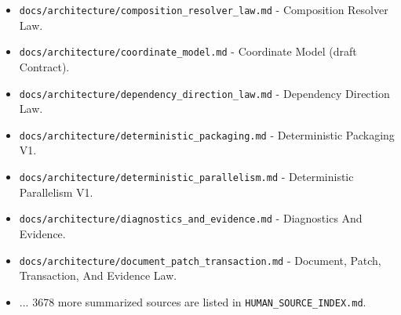 \documentclass[9pt,a4paper,openany]{book}
\begin{document}
\begin{itemize}
\item \texttt{docs/\allowbreak{}architecture/\allowbreak{}composition\_\allowbreak{}resolver\_\allowbreak{}law.\allowbreak{}md} -\allowbreak{} Composition Resolver Law.\allowbreak{}
\end{itemize}

\begin{itemize}
\item \texttt{docs/\allowbreak{}architecture/\allowbreak{}coordinate\_\allowbreak{}model.\allowbreak{}md} -\allowbreak{} Coordinate Model (draft Contract).\allowbreak{}
\end{itemize}

\begin{itemize}
\item \texttt{docs/\allowbreak{}architecture/\allowbreak{}dependency\_\allowbreak{}direction\_\allowbreak{}law.\allowbreak{}md} -\allowbreak{} Dependency Direction Law.\allowbreak{}
\end{itemize}

\begin{itemize}
\item \texttt{docs/\allowbreak{}architecture/\allowbreak{}deterministic\_\allowbreak{}packaging.\allowbreak{}md} -\allowbreak{} Deterministic Packaging V1.\allowbreak{}
\end{itemize}

\begin{itemize}
\item \texttt{docs/\allowbreak{}architecture/\allowbreak{}deterministic\_\allowbreak{}parallelism.\allowbreak{}md} -\allowbreak{} Deterministic Parallelism V1.\allowbreak{}
\end{itemize}

\begin{itemize}
\item \texttt{docs/\allowbreak{}architecture/\allowbreak{}diagnostics\_\allowbreak{}and\_\allowbreak{}evidence.\allowbreak{}md} -\allowbreak{} Diagnostics And Evidence.\allowbreak{}
\end{itemize}

\begin{itemize}
\item \texttt{docs/\allowbreak{}architecture/\allowbreak{}document\_\allowbreak{}patch\_\allowbreak{}transaction.\allowbreak{}md} -\allowbreak{} Document, Patch, Transaction, And Evidence Law.\allowbreak{}
\end{itemize}

\begin{itemize}
\item .\allowbreak{}.\allowbreak{}.\allowbreak{} 3678 more summarized sources are listed in \texttt{HUMAN\_\allowbreak{}SOURCE\_\allowbreak{}INDEX.\allowbreak{}md}.\allowbreak{}
\end{itemize}
\end{document}
